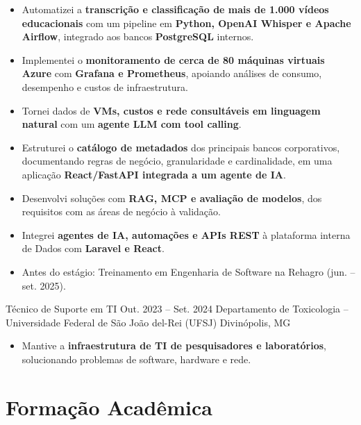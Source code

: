 \documentclass[10pt,a4paper]{article}
\begin{document}
\begin{itemize}

    \item Automatizei a \textbf{transcrição e classificação de mais de 1.000 vídeos
    educacionais} com um pipeline em \textbf{Python, OpenAI Whisper e Apache Airflow},
    integrado aos bancos \textbf{PostgreSQL} internos.

    \item Implementei o \textbf{monitoramento de cerca de 80 máquinas virtuais Azure} com
    \textbf{Grafana e Prometheus}, apoiando análises de consumo, desempenho e custos de infraestrutura.

    \item Tornei dados de \textbf{VMs, custos e rede consultáveis em linguagem natural} com um \textbf{agente LLM com tool calling}.

    \item Estruturei o \textbf{catálogo de metadados} dos principais bancos corporativos,
    documentando regras de negócio, granularidade e cardinalidade, em uma aplicação
    \textbf{React/FastAPI integrada a um agente de IA}.

    \item Desenvolvi soluções com \textbf{RAG, MCP e avaliação de modelos}, dos requisitos com as áreas de negócio à validação.

    \item Integrei \textbf{agentes de IA, automações e APIs REST} à plataforma interna de Dados com \textbf{Laravel e React}.

    \item Antes do estágio: Treinamento em Engenharia de Software na Rehagro (jun. -- set. 2025).

\end{itemize}

\entry
{Técnico de Suporte em TI}
{Out. 2023 -- Set. 2024}
{Departamento de Toxicologia -- Universidade Federal de São João del-Rei (UFSJ)}
{Divinópolis, MG}

\begin{itemize}

    \item Mantive a \textbf{infraestrutura de TI de pesquisadores e laboratórios}, solucionando problemas de software, hardware e rede.

\end{itemize}

\section*{Formação Acadêmica}
\end{document}

